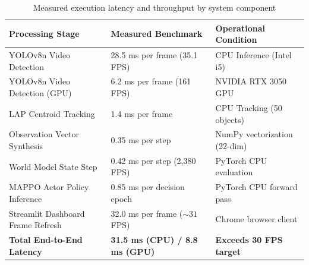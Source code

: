 \begin{table}[htbp]
\centering
\small
\caption{Measured execution latency and throughput by system component}
\label{tab:ch4_performance_metrics}
\begin{tabularx}{\textwidth}{|p{5.5cm}|p{4.5cm}|X|}
\hline
\textbf{Processing Stage} & \textbf{Measured Benchmark} & \textbf{Operational Condition} \\ \hline
YOLOv8n Video Detection & 28.5 ms per frame (35.1 FPS) & CPU Inference (Intel i5) \\ \hline
YOLOv8n Video Detection (GPU) & 6.2 ms per frame (161 FPS) & NVIDIA RTX 3050 GPU \\ \hline
LAP Centroid Tracking & 1.4 ms per frame & CPU Tracking (50 objects) \\ \hline
Observation Vector Synthesis & 0.35 ms per step & NumPy vectorization (22-dim) \\ \hline
World Model State Step & 0.42 ms per step (2,380 FPS) & PyTorch CPU evaluation \\ \hline
MAPPO Actor Policy Inference & 0.85 ms per decision epoch & PyTorch CPU forward pass \\ \hline
Streamlit Dashboard Frame Refresh & 32.0 ms per frame ($\sim 31$ FPS) & Chrome browser client \\ \hline
\textbf{Total End-to-End Latency} & \textbf{31.5 ms (CPU) / 8.8 ms (GPU)} & \textbf{Exceeds 30 FPS target} \\ \hline
\end{tabularx}
\end{table}

